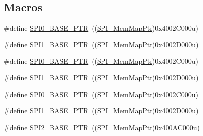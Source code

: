 \subsection*{Macros}
\begin{DoxyCompactItemize}
\item 
\#define \hyperlink{group___s_p_i___peripheral_ga851f64a97b5919c1f99a34db5918b3b4}{S\+P\+I0\+\_\+\+B\+A\+S\+E\+\_\+\+P\+TR}~((\hyperlink{group___s_p_i___peripheral_ga7e4e9921e4d56bdbb10a04e77743ff5e}{S\+P\+I\+\_\+\+Mem\+Map\+Ptr})0x4002\+C000u)
\item 
\#define \hyperlink{group___s_p_i___peripheral_gae28fd789e0602a32076c1c13ca39f5af}{S\+P\+I1\+\_\+\+B\+A\+S\+E\+\_\+\+P\+TR}~((\hyperlink{group___s_p_i___peripheral_ga7e4e9921e4d56bdbb10a04e77743ff5e}{S\+P\+I\+\_\+\+Mem\+Map\+Ptr})0x4002\+D000u)
\item 
\#define \hyperlink{group___s_p_i___peripheral_ga851f64a97b5919c1f99a34db5918b3b4}{S\+P\+I0\+\_\+\+B\+A\+S\+E\+\_\+\+P\+TR}~((\hyperlink{group___s_p_i___peripheral_ga7e4e9921e4d56bdbb10a04e77743ff5e}{S\+P\+I\+\_\+\+Mem\+Map\+Ptr})0x4002\+C000u)
\item 
\#define \hyperlink{group___s_p_i___peripheral_gae28fd789e0602a32076c1c13ca39f5af}{S\+P\+I1\+\_\+\+B\+A\+S\+E\+\_\+\+P\+TR}~((\hyperlink{group___s_p_i___peripheral_ga7e4e9921e4d56bdbb10a04e77743ff5e}{S\+P\+I\+\_\+\+Mem\+Map\+Ptr})0x4002\+D000u)
\item 
\#define \hyperlink{group___s_p_i___peripheral_ga851f64a97b5919c1f99a34db5918b3b4}{S\+P\+I0\+\_\+\+B\+A\+S\+E\+\_\+\+P\+TR}~((\hyperlink{group___s_p_i___peripheral_ga7e4e9921e4d56bdbb10a04e77743ff5e}{S\+P\+I\+\_\+\+Mem\+Map\+Ptr})0x4002\+C000u)
\item 
\#define \hyperlink{group___s_p_i___peripheral_gae28fd789e0602a32076c1c13ca39f5af}{S\+P\+I1\+\_\+\+B\+A\+S\+E\+\_\+\+P\+TR}~((\hyperlink{group___s_p_i___peripheral_ga7e4e9921e4d56bdbb10a04e77743ff5e}{S\+P\+I\+\_\+\+Mem\+Map\+Ptr})0x4002\+D000u)
\item 
\#define \hyperlink{group___s_p_i___peripheral_ga78714a4b750aa56fc56d1d223a560069}{S\+P\+I2\+\_\+\+B\+A\+S\+E\+\_\+\+P\+TR}~((\hyperlink{group___s_p_i___peripheral_ga7e4e9921e4d56bdbb10a04e77743ff5e}{S\+P\+I\+\_\+\+Mem\+Map\+Ptr})0x400\+A\+C000u)
\end{DoxyCompactItemize}
